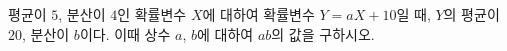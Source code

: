 평균이 $5$, 분산이 $4$인 확률변수 $X$에 대하여 확률변수 $Y=aX+10$일 때, $Y$의 평균이 $20$, 분산이 $b$이다. 이때 상수 $a$, $b$에 대하여 $ab$의 값을 구하시오.
